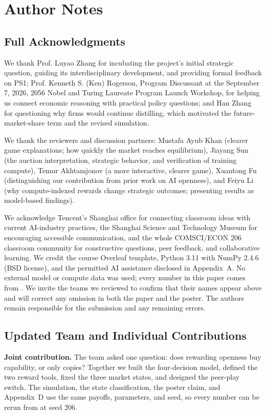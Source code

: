 \clearpage\balance
\section*{Author Notes}
\subsection*{Full Acknowledgments}
We thank Prof. Luyao Zhang for incubating the project's initial strategic question, guiding its interdisciplinary development, and providing formal feedback on PS1; Prof. Kenneth S. (Ken) Rogerson, Program Discussant at the September 7, 2026, 2056 Nobel and Turing Laureate Program Launch Workshop, for helping us connect economic reasoning with practical policy questions; and Han Zhang for questioning why firms would continue distilling, which motivated the future-market-share term and the revised simulation.

We thank the reviewers and discussion partners: Mustafa Ayub Khan (clearer game explanations; how quickly the market reaches equilibrium), Jiayang Sun (the auction interpretation, strategic behavior, and verification of training compute), Temur Akhtamjonov (a more interactive, clearer game), Xuantong Fu (distinguishing our contribution from prior work on AI openness), and Feiyu Li (why compute-indexed rewards change strategic outcomes; presenting results as model-based findings).

We acknowledge Tencent's Shanghai office for connecting classroom ideas with current AI-industry practices, the Shanghai Science and Technology Museum for encouraging accessible communication, and the whole COMSCI/ECON 206 classroom community for constructive questions, peer feedback, and collaborative learning. We credit the course Overleaf template, Python 3.11 with NumPy 2.4.6 (BSD license), and the permitted AI assistance disclosed in Appendix~A. No external model or compute data was used; every number in this paper comes from . We invite the teams we reviewed to confirm that their names appear above and will correct any omission in both the paper and the poster. The authors remain responsible for the submission and any remaining errors.

\subsection*{Updated Team and Individual Contributions}
\textbf{Joint contribution.} The team asked one question: does rewarding openness buy capability, or only copies? Together we built the four-decision model, defined the two reward tools, fixed the three market states, and designed the peer-play switch. The simulation, the state classification, the poster claim, and Appendix~D use the same payoffs, parameters, and seed, so every number can be rerun from  at seed 206.


